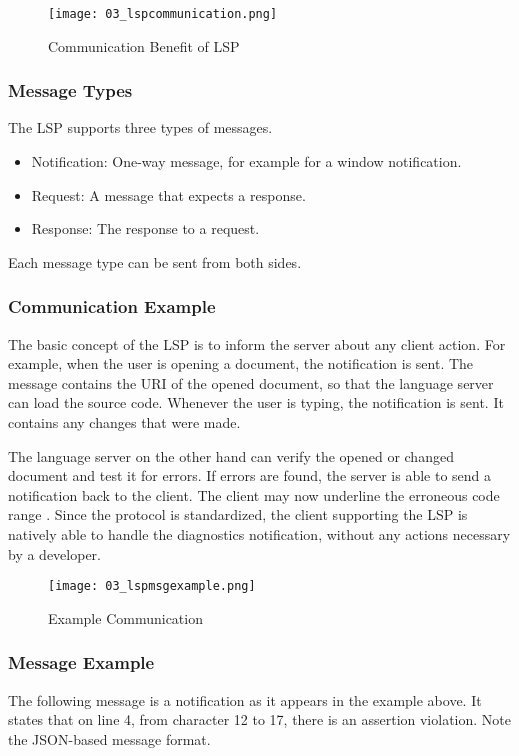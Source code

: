 \begin{figure}[h]
    \centering
    \texttt{[image: 03\_lspcommunication.png]}
    \caption{Communication Benefit of LSP}
    \label{fig:lspcommunication}
\end{figure}

\subsubsection{Message Types}
The LSP supports three types of messages.
\begin{itemize}
    \item Notification: One-way message, for example for a window notification.
    \item Request: A message that expects a response.
    \item Response: The response to a request.
\end{itemize}
Each message type can be sent from both sides.

\subsubsection{Communication Example}
The basic concept of the LSP is to inform the server about any client action.
For example, when the user is opening a document, the notification  is sent.
The message contains the URI of the opened document, so that the language server can load the source code.
Whenever the user is typing, the notification  is sent.
It contains any changes that were made.

The language server on the other hand can verify the opened or changed document and test it for errors.
If errors are found, the server is able to send a  notification back to the client.
The client may now underline the erroneous code range \cite{lspspec}.
Since the protocol is standardized, the client supporting the LSP is natively able to handle the diagnostics notification, without any actions necessary by a developer.

\begin{figure}[h]
    \centering
    \texttt{[image: 03\_lspmsgexample.png]}
    \caption{Example Communication}
    \label{fig:lspmsgexample}
\end{figure}

\subsubsection{Message Example}
The following message is a  notification as it appears in the example above.
It states that on line 4, from character 12 to 17, there is an assertion violation.
Note the JSON-based message format.\\


